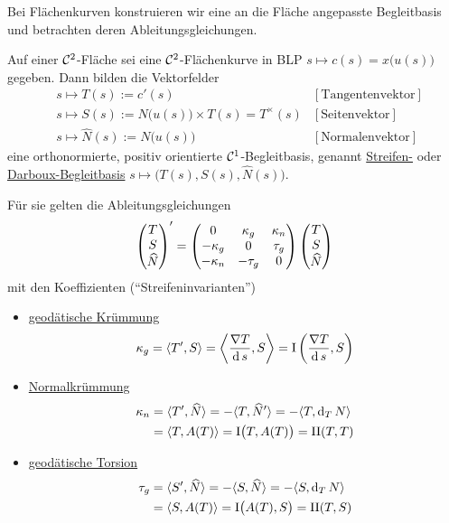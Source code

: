Bei Flächenkurven konstruieren wir eine an die Fläche angepasste Begleitbasis und betrachten deren Ableitungsgleichungen.

\begin{satz}\label{satz241}
 Auf einer \(\mathcal{C}^2\)-Fläche sei eine \(\mathcal{C}^2\)-Flächenkurve in BLP \(s \mapsto c(s) = x\big(u(s)\big)\) gegeben. Dann bilden die Vektorfelder
 \begin{align*}
  &s \mapsto T(s) := c'(s) & [\text{Tangentenvektor}] \\
  &s \mapsto S(s) := N\big(u(s)\big) \times T(s) = T^{\times}(s) & [\text{Seitenvektor}] \\
  &s \mapsto \hat N(s) := N\big(u(s)\big) & [\text{Normalenvektor}]
 \end{align*}
 eine orthonormierte, positiv orientierte \(\mathcal{C}^1\)-Begleitbasis, genannt \uline{Streifen-} oder \uline{Darboux-Begleitbasis} \(s \mapsto \big(T(s), S(s), \widehat N(s)\big)\). \par
 Für sie gelten die Ableitungsgleichungen
 \[
  \begin{pmatrix} T \\ S \\ \widehat N \end{pmatrix} ' = \begin{pmatrix}
		      0 & \kappa_g & \kappa_n \\
		      -\kappa_g  & 0 & \tau_g \\
		      -\kappa_n   & -\tau_g & 0
		     \end{pmatrix} \begin{pmatrix} T \\ S \\ \widehat N \end{pmatrix} 
 \]
 mit den Koeffizienten (``Streifeninvarianten'')
\begin{itemize}
 \item \uline{geodätische Krümmung}
  \[
   \kappa_g = \langle T', S \rangle = \left\langle \frac{\nabla T}{\dd s}, S \right\rangle = \Rom1 \left(\frac{\nabla T}{\dd s}, S\right)
  \]
  \item \uline{Normalkrümmung}
  \begin{align*}
   \kappa_n &= \langle T', \widehat N \rangle = - \langle T, \widehat N' \rangle = - \langle T, \dd_T N \rangle \\
    &= \langle T, A(T) \rangle = \Rom1 \big( T, A(T)\big) = \Rom2 (T,T)
  \end{align*}
  \item \uline{geodätische Torsion}
  \begin{align*}
   \tau_g &= \langle S', \widehat N \rangle = - \langle S, \widehat N \rangle = - \langle S, \dd_T N \rangle \\
   &=\langle S, A(T) \rangle = \Rom1 \big(A(T), S\big) = \Rom2 (T,S)
  \end{align*}
 \end{itemize}
\end{satz}


